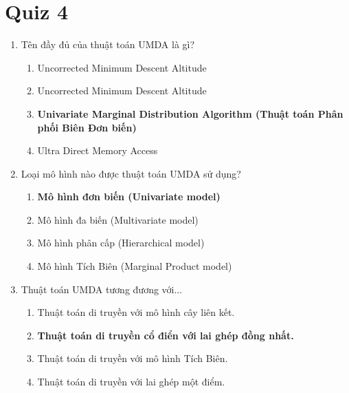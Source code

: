 \documentclass{book}
\begin{document}
\section{Quiz 4}
\begin{enumerate}
    \item Tên đầy đủ của thuật toán UMDA là gì?
    \begin{multicols}{2}
        \begin{enumerate}[label=\Alph*]
            \item Uncorrected Minimum Descent Altitude
            \item Uncorrected Minimum Descent Altitude
            \item \textbf{Univariate Marginal Distribution Algorithm (Thuật toán Phân phối Biên Đơn biến)}
            \item Ultra Direct Memory Access
        \end{enumerate}
    \end{multicols}

    \item Loại mô hình nào được thuật toán UMDA sử dụng?
    \begin{multicols}{2}
        \begin{enumerate}[label=\Alph*]
            \item \textbf{Mô hình đơn biến (Univariate model)}
            \item Mô hình đa biến (Multivariate model)
            \item Mô hình phân cấp (Hierarchical model)
            \item Mô hình Tích Biên (Marginal Product model)
        \end{enumerate}
    \end{multicols}

    \item Thuật toán UMDA tương đương với...
    \begin{multicols}{2}
        \begin{enumerate}[label=\Alph*]
            \item Thuật toán di truyền với mô hình cây liên kết.
            \item \textbf{Thuật toán di truyền cổ điển với lai ghép đồng nhất.}
            \item Thuật toán di truyền với mô hình Tích Biên.
            \item Thuật toán di truyền với lai ghép một điểm.
        \end{enumerate}
    \end{multicols}


\end{enumerate}
\end{document}
